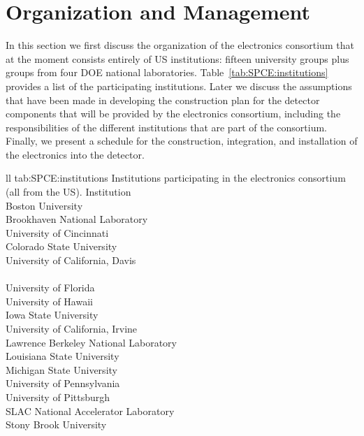 \section{Organization and Management}
\label{sec:fdsp-tpcelec-management}

In this section we first discuss the organization of the  electronics
consortium that at the moment consists entirely of US institutions: 
fifteen university groups plus groups from four DOE national 
laboratories. Table~\ref{tab:SPCE:institutions} provides a list 
of the participating institutions.
Later we discuss the assumptions that have been made in developing
the construction plan for the detector components that will be
provided by the  electronics consortium, including the responsibilities
of the different institutions that are part of the consortium. Finally,
we present a schedule for the construction, integration, and installation
of the  electronics into the detector. 

\begin{dunetable}
{ll}
{tab:SPCE:institutions}
{Institutions participating in the  electronics consortium (all from the US).}
Institution  \\ \toprowrule
Boston University \\ \colhline
Brookhaven National Laboratory \\ \colhline
University of Cincinnati \\ \colhline
Colorado State University  \\ \colhline
University of California, Davis \\ \colhline
{} \\ \colhline
University of Florida \\ \colhline
University of Hawaii \\ \colhline
Iowa State University \\ \colhline
University of California, Irvine \\ \colhline
Lawrence Berkeley National Laboratory \\ \colhline
Louisiana State University \\ \colhline
Michigan State University \\ \colhline
University of Pennsylvania \\ \colhline
University of Pittsburgh \\ \colhline
SLAC National Accelerator Laboratory \\ \colhline
Stony Brook University \\
\end{dunetable}

